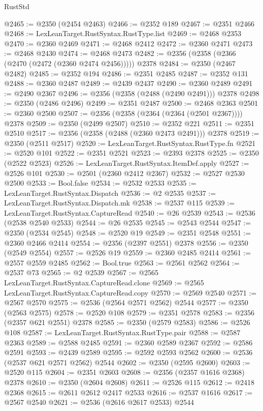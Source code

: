 \begin{lexlean}{RustStd}
\begin{coremodule}
@2465 := @2350 (@2454 @2463)
@2466 := @2352 @189
@2467 := @2351 @2466
@2468 := LexLeanTarget.RustSyntax.RustType.list
@2469 := @2468 @2353
@2470 := @2360 @2469
@2471 := @2468 @2412
@2472 := @2360 @2471
@2473 := @2468 @2430
@2474 := @2468 @2473
@2482 := @2356 (@2358 (@2366 (@2470 (@2472 (@2360 @2474 @2456))))) @2378
@2484 := @2350 (@2467 @2482)
@2485 := @2352 @194
@2486 := @2351 @2485
@2487 := @2352 @131
@2488 := @2360 @2487
@2489 := @2439 @2437
@2490 := @2360 @2489
@2491 := @2490 @2367
@2496 := @2356 (@2358 (@2488 (@2490 @2491))) @2378
@2498 := @2350 (@2486 @2496)
@2499 := @2351 @2487
@2500 := @2468 @2363
@2501 := @2360 @2500
@2507 := @2356 (@2358 (@2364 (@2364 (@2501 @2367)))) @2378
@2509 := @2350 (@2499 @2507)
@2510 := @2352 @221
@2511 := @2351 @2510
@2517 := @2356 (@2358 (@2488 (@2360 @2473 @2491))) @2378
@2519 := @2350 (@2511 @2517)
@2520 := LexLeanTarget.RustSyntax.RustType.fn
@2521 := @2520 @101
@2522 := @2351 @2521
@2523 := @2393 @2378
@2525 := @2350 (@2522 @2523)
@2526 := LexLeanTarget.RustSyntax.ItemDef.apply
@2527 := @2526 @101
@2530 := @2501 (@2360 @2412 @2367)
@2532 := @2527 @2530 @2500
@2533 := Bool.false
@2534 := @2532 @2533
@2535 := LexLeanTarget.RustSyntax.Dispatch
@2536 := @2 @2535
@2537 := LexLeanTarget.RustSyntax.Dispatch.mk
@2538 := @2537 @115
@2539 := LexLeanTarget.RustSyntax.CaptureRead
@2540 := @26 @2539
@2543 := @2536 (@2538 @2540 @2533)
@2544 := @26 @2535
@2545 := @2543 @2544
@2547 := @2350 (@2534 @2545)
@2548 := @2520 @19
@2549 := @2351 @2548
@2551 := @2360 @2466 @2414
@2554 := @2356 (@2397 @2551) @2378
@2556 := @2350 (@2549 @2554)
@2557 := @2526 @19
@2559 := @2360 @2485 @2414
@2561 := @2557 @2559 @2485
@2562 := Bool.true
@2563 := @2561 @2562
@2564 := @2537 @73
@2565 := @2 @2539
@2567 := @2565 LexLeanTarget.RustSyntax.CaptureRead.clone
@2569 := @2565 LexLeanTarget.RustSyntax.CaptureRead.copy
@2570 := @2569 @2540
@2571 := @2567 @2570
@2575 := @2536 (@2564 @2571 @2562) @2544
@2577 := @2350 (@2563 @2575)
@2578 := @2520 @108
@2579 := @2351 @2578
@2583 := @2356 (@2357 @621 @2551) @2378
@2585 := @2350 (@2579 @2583)
@2586 := @2526 @108
@2587 := LexLeanTarget.RustSyntax.RustType.pair
@2588 := @2587 @2363
@2589 := @2588 @2485
@2591 := @2360 @2589 @2367
@2592 := @2586 @2591
@2593 := @2439 @2589
@2595 := @2592 @2593 @2562
@2600 := @2536 (@2537 @621 @2571 @2562) @2544
@2602 := @2350 (@2595 @2600)
@2603 := @2520 @115
@2604 := @2351 @2603
@2608 := @2356 (@2357 @1616 @2368) @2378
@2610 := @2350 (@2604 @2608)
@2611 := @2526 @115
@2612 := @2418 @2368
@2615 := @2611 @2612 @2417 @2533
@2616 := @2537 @1616
@2617 := @2567 @2540
@2621 := @2536 (@2616 @2617 @2533) @2544

\end{coremodule}
\end{lexlean}
